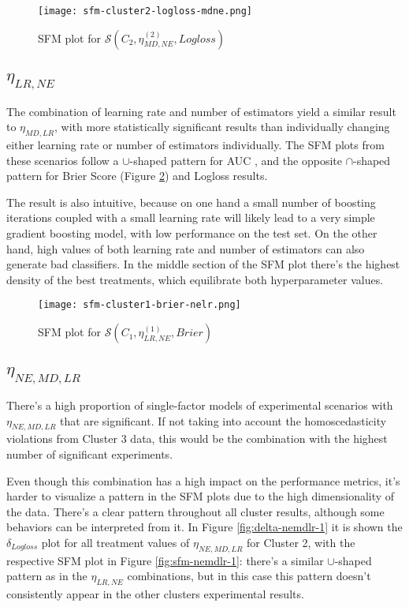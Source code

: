 \begin{figure}[H]
    \centering
    \texttt{[image: sfm-cluster2-logloss-mdne.png]}
    \caption{SFM plot for $\mathcal{S}(C_2, \eta^{(2)}_{MD, NE}, Logloss)$}
    \label{fig:sfm-mdne-1}
\end{figure}

\subsection{\texorpdfstring{\Large$\eta_{LR, NE}$}{}}

The combination of learning rate and number of estimators yield a similar result to $\eta_{MD, LR}$, with more statistically significant results than individually changing either learning rate or number of estimators individually. The SFM plots from these scenarios follow a $\cup$-shaped pattern for AUC , and the opposite $\cap$-shaped pattern for Brier Score (Figure \ref{fig:sfm-lrne-1}) and Logloss results.

The result is also intuitive, because on one hand a small number of boosting iterations coupled with a small learning rate will likely lead to a very simple gradient boosting model, with low performance on the test set. On the other hand, high values of both learning rate and number of estimators can also generate bad classifiers. In the middle section of the SFM plot there's the highest density of the best treatments, which equilibrate both hyperparameter values.

\begin{figure}[H]
    \centering
    \texttt{[image: sfm-cluster1-brier-nelr.png]}
    \caption{SFM plot for $\mathcal{S}(C_1, \eta^{(1)}_{LR, NE}, Brier)$}
    \label{fig:sfm-lrne-1}
\end{figure}

\subsection{\texorpdfstring{\Large$\eta_{NE, MD, LR}$}{}}

There's a high proportion of single-factor models of experimental scenarios with $\eta_{NE, MD, LR}$ that are significant. If not taking into account the homoscedasticity violations from Cluster 3 data, this would be the combination with the highest number of significant experiments.

Even though this combination has a high impact on the performance metrics, it's harder to visualize a pattern in the SFM plots due to the high dimensionality of the data. There's a clear pattern throughout all cluster results, although some behaviors can be interpreted from it. In Figure \ref{fig:delta-nemdlr-1} it is shown the $\delta_{Logloss}$ plot for all treatment values of $\eta_{NE, MD, LR}$ for Cluster 2, with the respective SFM plot in Figure \ref{fig:sfm-nemdlr-1}: there's a similar $\cup$-shaped pattern as in the $\eta_{LR, NE}$ combinations, but in this case this pattern doesn't consistently appear in the other clusters experimental results.

